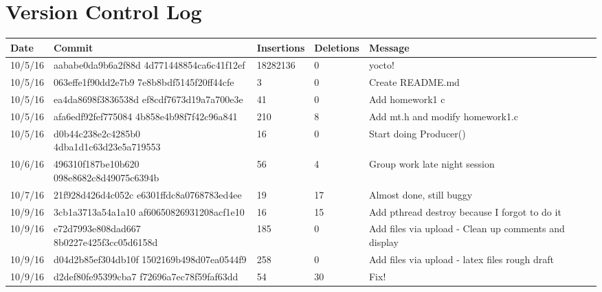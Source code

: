 \documentclass[letterpaper,10pt,draftclsnofoot,titlepage,onecolumn]{IEEEtran}
\begin{document}
	\clearpage

	\section{Version Control Log}
	
\begin{center}

 \begin{tabular}{| m{2cm} | m{5cm} | m{2cm} | m{2cm} | m{3cm} | } 
\hline
 Date & Commit & Insertions & Deletions & Message \\ [0.5ex] 
 \hline\hline
  10/5/16 & aababe0da9b6a2f88d 4d771448854ca6c41f12ef & 18282136 & 0 & yocto! \\
 \hline
  10/5/16 & 063effe1f90dd2e7b9 7e8b8bdf5145f20ff44cfe & 3 & 0 & Create README.md \\
 \hline
  10/5/16 & ea4da8698f3836538d ef8cdf7673d19a7a700e3e & 41 & 0 & Add homework1 c \\
 \hline
  10/5/16 & afa6edf92fef775084 4b858e4b98f7f42c96a841 & 210 & 8 & Add mt.h and modify homework1.c \\
 \hline
  10/5/16 & d0b44c238e2c4285b0 4dba1d1c63d23e5a719553 & 16 & 0 & Start doing Producer() \\
 \hline
  10/6/16 & 496310f187be10b620 098e8682c8d49075c6394b & 56 & 4 & Group work late night session \\
 \hline
   10/7/16 & 21f928d426d4c052c e6301ffdc8a0768783ed4ee & 19 & 17 & Almost done, still buggy \\
 \hline
   10/9/16 & 3cb1a3713a54a1a10 af60650826931208acf1e10 & 16 & 15 & Add pthread destroy because I forgot to do it \\
 \hline
   10/9/16 & e72d7993e808dad667 8b0227e425f3cc05d6158d & 185 & 0 & Add files via upload - Clean up comments and display\\
 \hline
   10/9/16 & d04d2b85ef304db10f 1502169b498d07ea0544f9 & 258 & 0 & Add files via upload - latex files rough draft\\
 \hline
   10/9/16 & d2def80fe95399cba7 f72696a7ec78f59faf63dd & 54 & 30 & Fix!\\
 \hline
 
\end{tabular}
\end{center}
	
\clearpage
\end{document}
